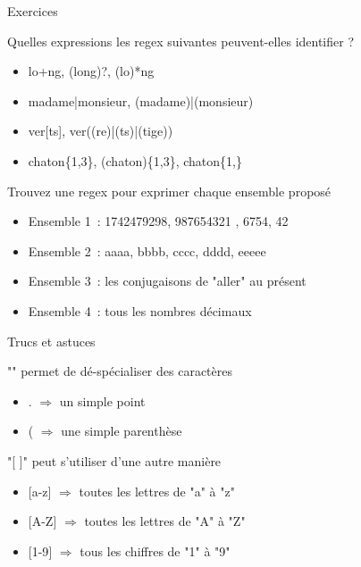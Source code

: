 \documentclass[serif, aspectratio=169]{beamer}
\begin{document}
\begin{exoframe}{Exercices}
    \begin{block}{Quelles expressions les regex suivantes peuvent-elles identifier ?}
        \begin{itemize} \color{white}
            \item lo+ng, (long)?, (lo)*ng
            \item madame|monsieur, (madame)|(monsieur)
            \item ver[ts], ver((re)|(ts)|(tige))
            \item chaton\{1,3\}, (chaton)\{1,3\}, chaton\{1,\}
        \end{itemize}
    \end{block}
    \begin{block}{Trouvez une regex pour exprimer chaque ensemble proposé}
        \begin{itemize} \color{white}
            \item Ensemble 1~: 1742479298, 987654321 , 6754, 42
            \item Ensemble 2~: aaaa, bbbb, cccc, dddd, eeeee
            \item Ensemble 3~: les conjugaisons de "aller" au présent
            \item Ensemble 4~: tous les nombres décimaux
        \end{itemize}
    \end{block}
\end{exoframe}

\begin{frame}{Trucs et astuces}
    \begin{block}{"\bs " permet de dé-spécialiser des caractères}
        \begin{itemize}
            \item \bs . $\Rightarrow$ un simple point
            \item \bs ( $\Rightarrow$ une simple parenthèse
        \end{itemize}
    \end{block}
    \begin{block}{"{[} {]}" peut s'utiliser d'une autre manière}
        \begin{itemize}
            \item {[}a-z{]} $\Rightarrow$ toutes les lettres de "a" à "z"
            \item {[}A-Z{]} $\Rightarrow$ toutes les lettres de "A" à "Z"
            \item {[}1-9{]} $\Rightarrow$ tous les chiffres de "1" à "9"
        \end{itemize}
    \end{block}
\end{frame}
\end{document}

